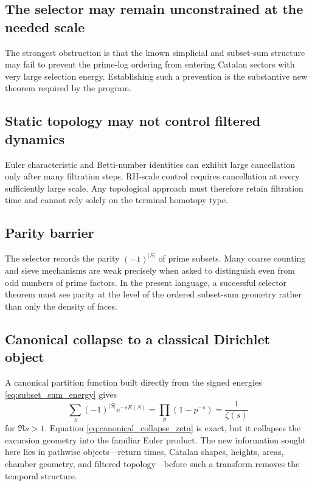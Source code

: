 \documentclass[11pt]{amsart}
\numberwithin{equation}{section}
\theoremstyle{plain}
\theoremstyle{definition}
\theoremstyle{remark}
\begin{document}
\subsection{The selector may remain unconstrained at the needed scale}
\label{subsec:obstruction_selector}

The strongest obstruction is that the known simplicial and subset-sum structure may fail to prevent the prime-log ordering from entering Catalan sectors with very large selection energy.  Establishing such a prevention is the substantive new theorem required by the program.

\subsection{Static topology may not control filtered dynamics}
\label{subsec:obstruction_static_dynamic}

Euler characteristic and Betti-number identities can exhibit large cancellation only after many filtration steps.  RH-scale control requires cancellation at every sufficiently large scale.  Any topological approach must therefore retain filtration time and cannot rely solely on the terminal homotopy type.

\subsection{Parity barrier}
\label{subsec:obstruction_parity}

The selector records the parity $(-1)^{|S|}$ of prime subsets.  Many coarse counting and sieve mechanisms are weak precisely when asked to distinguish even from odd numbers of prime factors.  In the present language, a successful selector theorem must see parity at the level of the ordered subset-sum geometry rather than only the density of faces.

\subsection{Canonical collapse to a classical Dirichlet object}
\label{subsec:obstruction_canonical_collapse}

A canonical partition function built directly from the signed energies \eqref{eq:subset_sum_energy} gives
\begin{equation}
\sum_{S}(-1)^{|S|}e^{-sE(S)}
=
\prod_p(1-p^{-s})
=
\frac{1}{\zeta(s)}
\label{eq:canonical_collapse_zeta}
\end{equation}
for $\Re s>1$.  Equation \eqref{eq:canonical_collapse_zeta} is exact, but it collapses the excursion geometry into the familiar Euler product.  The new information sought here lies in pathwise objects---return times, Catalan shapes, heights, areas, chamber geometry, and filtered topology---before such a transform removes the temporal structure.
\end{document}
